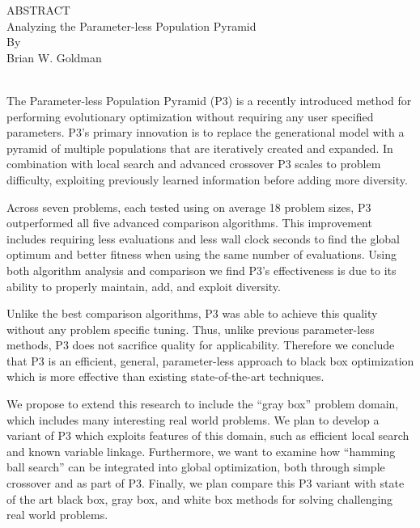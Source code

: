 \thispagestyle{empty} \setcounter{page}{2}
\begin{doublespace}
\begin{centering}
ABSTRACT\\ %
Analyzing the Parameter-less Population Pyramid \\ %
By \\ %
Brian W. Goldman\\ %
\ \\
\end{centering}

The Parameter-less Population Pyramid (P3) is a recently introduced method for performing
evolutionary optimization without requiring any user specified parameters.
P3's primary innovation is to replace the generational model with a pyramid of
multiple populations that are iteratively created and expanded. In combination
with local search and advanced crossover P3 scales to problem difficulty, exploiting
previously learned information before adding more diversity.

Across seven problems, each tested using on average 18 problem sizes, P3 outperformed
all five advanced comparison algorithms. This improvement includes requiring less evaluations
and less wall clock seconds to find the global optimum and better fitness when using
the same number of evaluations. Using both algorithm analysis and comparison we find P3's
effectiveness is due to its ability to properly maintain, add, and exploit diversity.

Unlike the best comparison algorithms, P3 was able to achieve this quality without any
problem specific tuning. Thus, unlike previous parameter-less methods, P3 does not
sacrifice quality for applicability. Therefore we conclude that
P3 is an efficient, general, parameter-less approach to black box
optimization which is more effective than existing state-of-the-art techniques.

We propose to extend this research to include the ``gray box'' problem domain, which includes many
interesting real world problems. We plan to develop a variant of P3 which exploits
features of this domain, such as efficient local search and known variable linkage.
Furthermore, we want to examine how ``hamming ball search'' can be integrated into
global optimization, both through simple crossover and as part of P3.
Finally, we plan compare this P3 variant with state of the art black box, gray box, and
white box methods for solving challenging real world problems.
\end{doublespace}
\newpage

